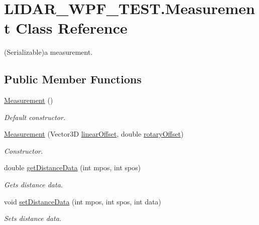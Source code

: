 \hypertarget{class_l_i_d_a_r___w_p_f___t_e_s_t_1_1_measurement}{}\section{L\+I\+D\+A\+R\+\_\+\+W\+P\+F\+\_\+\+T\+E\+S\+T.\+Measurement Class Reference}
\label{class_l_i_d_a_r___w_p_f___t_e_s_t_1_1_measurement}


(Serializable)a measurement.  


\subsection*{Public Member Functions}
\begin{DoxyCompactItemize}
\item 
\hyperlink{class_l_i_d_a_r___w_p_f___t_e_s_t_1_1_measurement_a2225e9ff474bd7dfc5f297a640540076}{Measurement} ()
\begin{DoxyCompactList}\small\item\em Default constructor. \end{DoxyCompactList}\item 
\hyperlink{class_l_i_d_a_r___w_p_f___t_e_s_t_1_1_measurement_a4cca756692fc62ae2ee46f42d6fe823d}{Measurement} (Vector3\+D \hyperlink{class_l_i_d_a_r___w_p_f___t_e_s_t_1_1_measurement_a9a2cf4d11bf826c96533fcaae3bcc4a4}{linear\+Offset}, double \hyperlink{class_l_i_d_a_r___w_p_f___t_e_s_t_1_1_measurement_a711a9fb756fea70444b65523eab7d9fd}{rotary\+Offset})
\begin{DoxyCompactList}\small\item\em Constructor. \end{DoxyCompactList}\item 
double \hyperlink{class_l_i_d_a_r___w_p_f___t_e_s_t_1_1_measurement_a6619edf15002730ce225af3d68b89d99}{get\+Distance\+Data} (int mpos, int spos)
\begin{DoxyCompactList}\small\item\em Gets distance data. \end{DoxyCompactList}\item 
void \hyperlink{class_l_i_d_a_r___w_p_f___t_e_s_t_1_1_measurement_a2db8b7b8c4887122f2418e011197504d}{set\+Distance\+Data} (int mpos, int spos, int data)
\begin{DoxyCompactList}\small\item\em Sets distance data. \end{DoxyCompactList}\item 

\end{DoxyCompactItemize}
